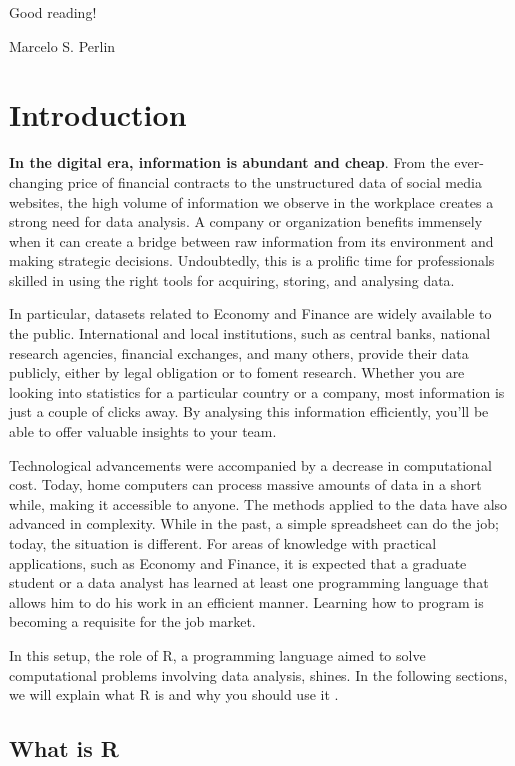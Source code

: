 \documentclass[11pt,]{book}
\begin{document}
Good reading!

Marcelo S. Perlin

\chapter{Introduction}\label{introduction}

\textbf{In the digital era, information is abundant and cheap}. From the
ever-changing price of financial contracts to the unstructured data of
social media websites, the high volume of information we observe in the
workplace creates a strong need for data analysis. A company or
organization benefits immensely when it can create a bridge between raw
information from its environment and making strategic decisions.
Undoubtedly, this is a prolific time for professionals skilled in using
the right tools for acquiring, storing, and analysing data.

In particular, datasets related to Economy and Finance are widely
available to the public. International and local institutions, such as
central banks, national research agencies, financial exchanges, and many
others, provide their data publicly, either by legal obligation or to
foment research. Whether you are looking into statistics for a
particular country or a company, most information is just a couple of
clicks away. By analysing this information efficiently, you'll be able
to offer valuable insights to your team.

Technological advancements were accompanied by a decrease in
computational cost. Today, home computers can process massive amounts of
data in a short while, making it accessible to anyone. The methods
applied to the data have also advanced in complexity. While in the past,
a simple spreadsheet can do the job; today, the situation is different.
For areas of knowledge with practical applications, such as Economy and
Finance, it is expected that a graduate student or a data analyst has
learned at least one programming language that allows him to do his work
in an efficient manner. Learning how to program is becoming a requisite
for the job market.

In this setup, the role of R, a programming language aimed to solve
computational problems involving data analysis, shines. In the following
sections, we will explain what R is and why you should use it .

\section{What is R}\label{what-is-r}
\end{document}
